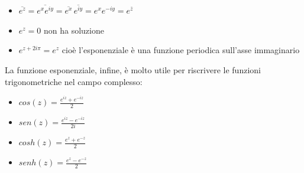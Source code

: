 \begin{itemize}
\item $\overline{e^z}=\overline{e^x e^{iy}}=\overline{e^x} \, \overline{e^{iy}} =e^x e^{-iy} =e^ {\overline{z}}$
\item $e^z =0$ non ha soluzione
\item $e^{z+2i\pi}=e^z$ cioè l'esponenziale è una funzione periodica sull'asse immaginario
\end{itemize}

La funzione esponenziale, infine, è molto utile per riscrivere le funzioni trigonometriche nel campo complesso:

\begin{itemize}
\item $cos(z)=\frac{e^{iz}+e^{-iz}}{2}$
\item $sen(z)=\frac{e^{iz}-e^{-iz}}{2i}$
\item $cosh(z)=\frac{e^z+e^{-z}}{2}$
\item $senh(z)=\frac{e^z-e^{-z}}{2}$
\end{itemize}


